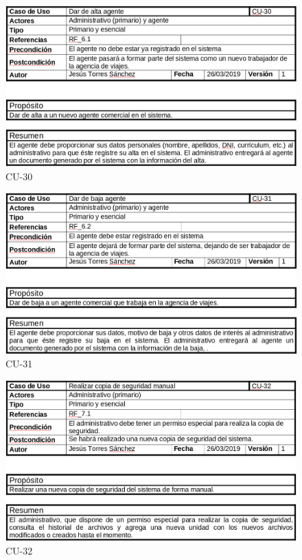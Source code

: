 \documentclass{article}
\begin{document}
	\begin{figure}[H]
		\centering
		\includegraphics[totalheight=8cm]{cu-30}
		\caption{CU-30}
		\label{fig:cu-30}
	\end{figure}

	\begin{figure}[H]
		\centering
		\includegraphics[totalheight=8cm]{cu-31}
		\caption{CU-31}
		\label{fig:cu-31}
	\end{figure}
		
	\begin{figure}[H]
		\centering
		\includegraphics[totalheight=8cm]{cu-32}
		\caption{CU-32}
		\label{fig:cu-32}
	\end{figure}
\end{document}
